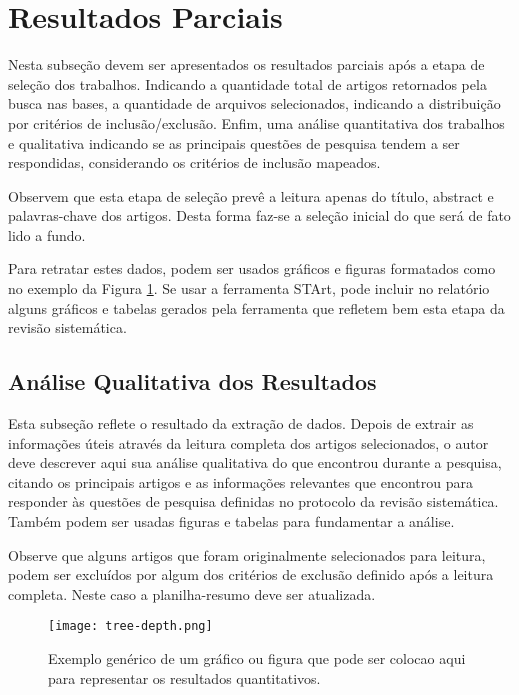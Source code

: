 \documentclass[12pt]{article}
\begin{document}
\section{Resultados Parciais}

Nesta subseção devem ser apresentados os resultados parciais após a etapa de seleção dos trabalhos. Indicando a quantidade total de artigos retornados pela busca nas bases, a quantidade de arquivos selecionados, indicando a distribuição por critérios de inclusão/exclusão. Enfim, uma análise quantitativa dos trabalhos e qualitativa indicando se as principais questões de pesquisa tendem a ser respondidas, considerando os critérios de inclusão mapeados. 

Observem que esta etapa de seleção prevê a leitura apenas do título, abstract e palavras-chave dos artigos. Desta forma faz-se a seleção inicial do que será de fato lido a fundo. 

Para retratar estes dados, podem ser usados gráficos e figuras formatados como no exemplo da Figura \ref{fig:depth}. Se usar a ferramenta STArt, pode incluir no relatório alguns gráficos e tabelas gerados pela ferramenta que refletem bem esta etapa da revisão sistemática.

\subsection{Análise Qualitativa dos Resultados}

Esta subseção reflete o resultado da extração de dados. Depois de extrair as informações úteis através da leitura completa dos artigos selecionados, o autor deve descrever aqui sua análise qualitativa do que encontrou durante a pesquisa, citando os principais artigos e as informações relevantes que encontrou para responder às questões de pesquisa definidas no protocolo da revisão sistemática. Também podem ser usadas figuras e tabelas para fundamentar a análise. 

Observe que alguns artigos que foram originalmente selecionados para leitura, podem ser excluídos por algum dos critérios de exclusão definido após a leitura completa. Neste caso a planilha-resumo deve ser atualizada.

\begin{figure}[tb]
    \centering
    \texttt{[image: tree-depth.png]}
    \caption{Exemplo genérico de um gráfico ou figura que pode ser colocao aqui para representar os resultados quantitativos.}
    \label{fig:depth}
\end{figure}
\end{document}
